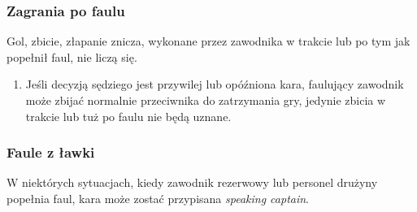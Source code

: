\documentclass[11pt,a4paper]{article}
\begin{document}
\subsubsection{Zagrania po faulu}
Gol, zbicie, złapanie znicza, wykonane przez zawodnika w trakcie lub po tym jak popełnił faul, nie liczą się.
\begin{enumerate}
  \item Jeśli decyzją sędziego jest przywilej lub opóźniona kara, faulujący zawodnik może zbijać normalnie przeciwnika do zatrzymania gry, jedynie zbicia w trakcie lub tuż po faulu nie będą uznane.
\end{enumerate}

\subsubsection{Faule z ławki}
W niektórych sytuacjach, kiedy zawodnik rezerwowy lub personel drużyny popełnia faul, kara może zostać przypisana \emph{speaking captain}.
\end{document}

